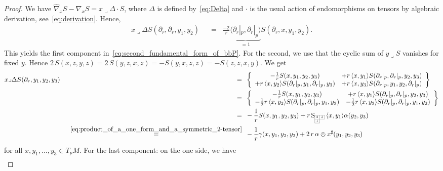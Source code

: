 \documentclass[11pt,a4paper]{article}
\theoremstyle{plain}
\theoremstyle{remark}
\newcommand{\rmS}{\mathrm{S}}
\begin{document}
\begin{proof}
We have $\hat \nabla_xS - \nabla_xS = x\lrcorner \Delta\cdot S$, where $\Delta$ is defined by~\eqref{eq:Delta} and $\cdot$ is the usual action of endomorphisms on tensors by algebraic derivation, see~\eqref{eq:derivation}. Hence,
\begin{align*}
x\lrcorner \Delta S(\partial_r,\partial_r,y_1,y_2) &\;\;=\;\; \frac{- 2}{r}\underbrace{\langle \partial_r|_p,\partial_r|_p \rangle}_{=1} S( \partial_r,x,y_1,y_2).
\end{align*}
This yields the first component in~\eqref{eq:second_fundamental_form_of_bbP}. For the second, we use that the cyclic sum of $y\lrcorner S$ vanishes for fixed $y$. 
Hence $ 2\, S(x,z,y,z) = 2\, S(y,z,x,z) = - S(y,x,z,z) = - S(z,z,x,y)$. We get
\begin{align*}
& x\lrcorner \Delta S(\partial_r,y_1,y_2,y_3) &\;\;=\;\;& \left \lbrace\begin{array}{cc}- \frac{1}{r} S(x,y_1,y_2,y_3)  & + r\, \langle x,y_1 \rangle S(\partial_r|_p,\partial_r|_p,y_2,y_3)\\
+ r\, \langle x,y_2 \rangle S(\partial_r|_p,y_1,\partial_r|_p,y_3) & + r\, \langle x,y_3\rangle S(\partial_r|_p,y_1,y_2,\partial_r|_p)  \end{array} \right \rbrace\\
& &\;\;=\;\;&  \left \lbrace\begin{array}{cc}-\frac{1}{r} S(x,y_1,y_2,y_3)  & + r\, \langle x,y_1 \rangle S(\partial_r|_p,\partial_r|_p,y_2,y_3)\\
- \frac{1}{2} r\, \langle x,y_2 \rangle S(\partial_r|_p,\partial_r|_p,y_1,y_3) & - \frac{1}{2}r\, \langle x,y_3 \rangle S(\partial_r|_p,\partial_r|_p,y_1,y_2)  \end{array} \right \rbrace\\
& &\;\;=\;\;& - \frac{1}{r} S(x,y_1,y_2,y_3) + r\, \rmS_{\scaleto{\begin{array}{|c|c|}
\cline{1-2}
2 & 3 \\
\cline{1-2}
1 \\
\cline{1-1} 
\end{array}}{12pt}}\, \langle x, y_1\rangle \alpha(y_2,y_3)\\
& & \;\;\stackrel{\eqref{eq:product_of_a_one_form_and_a_symmetric_2-tensor}}{=}\;\; &  - \frac{1}{r} \gamma(x,y_1,y_2,y_3) + 2\,r\,  \alpha\owedge x^\sharp (y_1,y_2,y_3)
\end{align*}
for all $x,y_1,\ldots,y_3\in T_pM$.  For the last component: on the one side, we have
\begin{align*}

\end{align*}
\end{proof}
\end{document}
